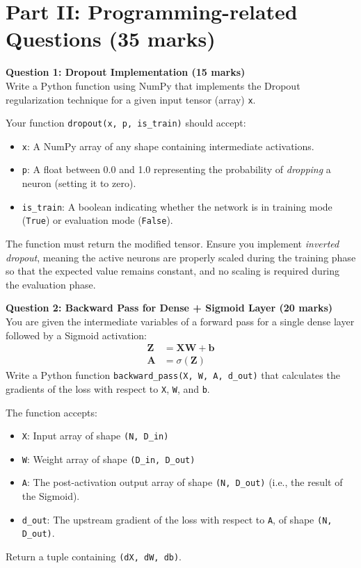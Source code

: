 \documentclass[11pt]{article}
\begin{document}
\vspace{1cm}

\section*{Part II: Programming-related Questions (35 marks)}

\textbf{Question 1: Dropout Implementation (15 marks)}\\
Write a Python function using NumPy that implements the Dropout regularization technique for a given input tensor (array) \texttt{x}. 

Your function \texttt{dropout(x, p, is\_train)} should accept:
\begin{itemize}
    \item \texttt{x}: A NumPy array of any shape containing intermediate activations.
    \item \texttt{p}: A float between 0.0 and 1.0 representing the probability of \textit{dropping} a neuron (setting it to zero).
    \item \texttt{is\_train}: A boolean indicating whether the network is in training mode (\texttt{True}) or evaluation mode (\texttt{False}).
\end{itemize}
The function must return the modified tensor. Ensure you implement \textit{inverted dropout}, meaning the active neurons are properly scaled during the training phase so that the expected value remains constant, and no scaling is required during the evaluation phase.

\vspace{0.5cm}

\textbf{Question 2: Backward Pass for Dense + Sigmoid Layer (20 marks)}\\
You are given the intermediate variables of a forward pass for a single dense layer followed by a Sigmoid activation:
\begin{align*}
\mathbf{Z} &= \mathbf{X} \mathbf{W} + \mathbf{b} \\
\mathbf{A} &= \sigma(\mathbf{Z})
\end{align*}
Write a Python function \texttt{backward\_pass(X, W, A, d\_out)} that calculates the gradients of the loss with respect to \texttt{X}, \texttt{W}, and \texttt{b}. 

The function accepts:
\begin{itemize}
    \item \texttt{X}: Input array of shape \texttt{(N, D\_in)}
    \item \texttt{W}: Weight array of shape \texttt{(D\_in, D\_out)}
    \item \texttt{A}: The post-activation output array of shape \texttt{(N, D\_out)} (i.e., the result of the Sigmoid).
    \item \texttt{d\_out}: The upstream gradient of the loss with respect to \texttt{A}, of shape \texttt{(N, D\_out)}.
\end{itemize}
Return a tuple containing \texttt{(dX, dW, db)}.
\end{document}
